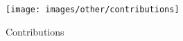 \begin{figure}[h!]
\centering
\texttt{[image: images/other/contributions]}
\caption[Contributions]{Contributions}
\label{fig:contributions}
\end{figure}

